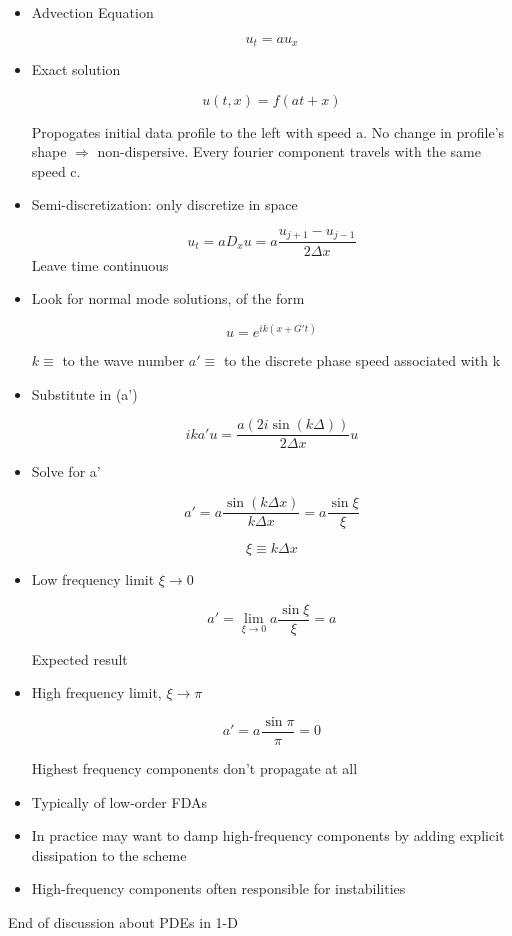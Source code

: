 \begin{itemize}
    \item Advection Equation

    \[ u_{t} = a u_x\]

    \item Exact solution

    \[u(t,x) = f(at+x)\]

    Propogates initial data profile to the left with speed a. No change in profile's shape $\Rightarrow$ non-dispersive. Every fourier component travels with the same speed c.

    \item Semi-discretization: only discretize in space

    \[ u_t = a D_x u = a \frac{u_{j+1}-u_{j-1}}{2\Delta x}\]
    Leave time continuous

    \item Look for normal mode solutions, of the form

    \[ u = e^{ik(x+G't)}\]

    $k \equiv $ to the wave number \newline
    $a' \equiv $ to the discrete phase speed associated with k

    \item Substitute in (a')

    \[ ika' u = \frac{a (2 i \sin(k \Delta ))}{2\Delta x} u \]

    \item Solve for a'

    \[ a' = a \frac{\sin(k \Delta x)}{k\Delta x} = a \frac{\sin\xi}{\xi}\]

    \[ \xi \equiv k \Delta x\]

    \item Low frequency limit $\xi \rightarrow 0$

    \[ a' = \lim_{\xi\rightarrow0} a \frac{\sin\xi}{\xi} = a \]

    Expected result

    \item High frequency limit, $\xi \rightarrow \pi$

    \[ a' = a \frac{\sin \pi}{\pi} = 0 \]

    Highest frequency components don't propagate at all

    \item Typically of low-order FDAs

    \item In practice may want to damp high-frequency components by adding explicit dissipation to the scheme

    \item High-frequency components often responsible for instabilities
\end{itemize}

End of discussion about PDEs in 1-D